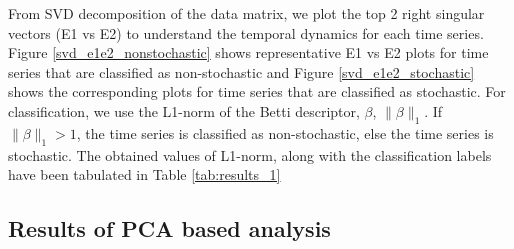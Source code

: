 \documentclass[journal]{IEEEtran}
\begin{document}
	From SVD decomposition of the data matrix, we plot the top 2 right singular vectors (E1 vs E2) to understand the temporal dynamics for each time series. Figure \ref{svd_e1e2_nonstochastic} shows representative E1 vs E2 plots for time series  that are classified as non-stochastic and Figure \ref{svd_e1e2_stochastic}  shows the corresponding plots for time series that are classified as stochastic. For classification, we use the L1-norm of the Betti descriptor, $\beta$, $\|\beta\|_1$. If $\|\beta\|_1 > 1$, the time series is classified as non-stochastic, else the time series is stochastic. The obtained values of L1-norm, along with the classification labels have been tabulated in Table \ref{tab:results_1}
	
	
	
	

	
	\subsection{Results of PCA based analysis}
	
	
	
	
\end{document}
